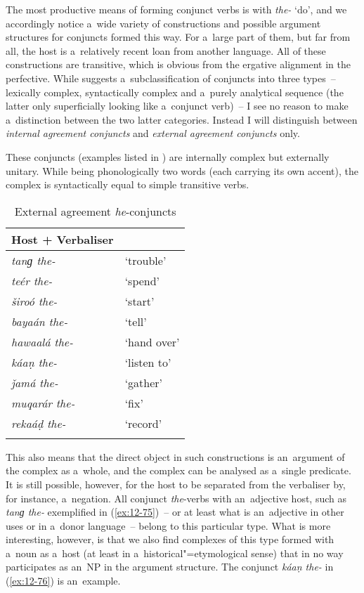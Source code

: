 The most productive means of forming conjunct verbs is with \textit{the-} `do', and we accordingly notice a~wide variety of constructions and possible argument structures for conjuncts formed this way. For a~large part of them, but far from all, the host is a~relatively recent loan from another language. All of these constructions are transitive, which is obvious from the ergative alignment in the perfective. While \citet[201]{verma1993} suggests a~subclassification of conjuncts into three types~-- lexically complex, syntactically complex and a~purely analytical sequence (the latter only superficially looking like a~conjunct verb)~-- I see no reason to make a~distinction between the two latter categories. Instead I will distinguish between \textit{internal agreement conjuncts} and \textit{external agreement conjuncts} only.


 These conjuncts (examples listed in ) are internally complex but externally unitary. While being phonologically two words (each carrying its own accent), the complex is syntactically equal to simple transitive verbs.


\begin{table}[ht]
\caption{External agreement \textit{he}-conjuncts}
\begin{tabularx}{.5\textwidth}{ l@{\hspace{25pt}} Q }
\lsptoprule
Host + Verbaliser &
\\\hline
\textit{tanɡ the-} &
`trouble'\\
\textit{teér the-} &
`spend'\\
\textit{široó the-} &
`start'\\
\textit{bayaán the-} &
`tell'\\
\textit{hawaalá the-} &
`hand over'\\
\textit{káaṇ the-} &
`listen to'\\
\textit{ǰamá the-} &
`gather'\\
\textit{muqarár the-} &
`fix'\\
\textit{rekaáḍ the-} &
`record'\\\lspbottomrule
\end{tabularx}
\label{tab:12-3}
\end{table}


This also means that the direct object in such constructions is an~argument of the complex as a~whole, and the complex can be analysed as a~single predicate. It is still possible, however, for the host to be separated from the verbaliser by, for instance, a~negation. All conjunct \textit{the}-verbs with an~adjective host, such as \textit{tanɡ the-} exemplified in (\ref{ex:12-75})~-- or at least what is an~adjective in other uses or in a~donor language~-- belong to this particular type. What is more interesting, however, is that we also find complexes of this type formed with a~noun as a~host (at least in a~historical"=etymological sense) that in no way participates as an~NP in the argument structure. The conjunct \textit{káaṇ the-} in (\ref{ex:12-76}) is an~example. 

